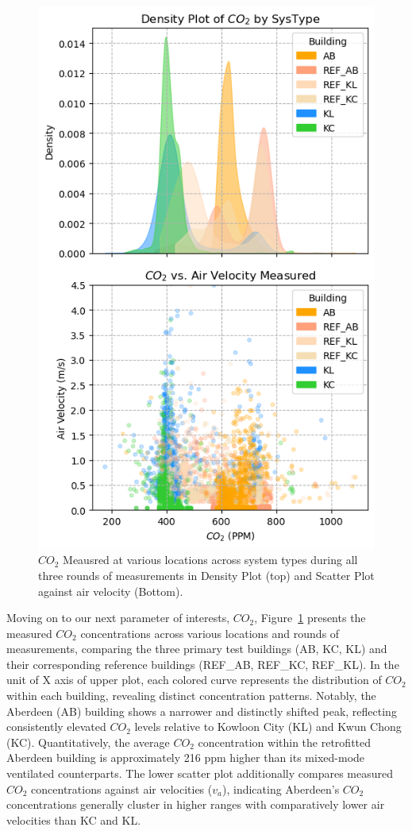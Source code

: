 \documentclass[preprint,12pt]{elsarticle}
\begin{document}
\begin{figure}[h!]
    \centering
    \includegraphics[width=0.5\linewidth]{COST_CO2.png}
    \caption{$CO_2$ Meausred at various locations across system types during all three rounds of measurements in Density Plot (top) and Scatter Plot  against air velocity (Bottom).}
    \label{fig:$CO_2$-types-meas}
\end{figure}


Moving on to our next parameter of interests, $CO_2$, Figure~\ref{fig:$CO_2$-types-meas} presents the measured $CO_2$ concentrations across various locations and rounds of measurements, comparing the three primary test buildings (AB, KC, KL) and their corresponding reference buildings (REF\_AB, REF\_KC, REF\_KL). In the unit of X axis of upper plot, each colored curve represents the distribution of $CO_2$ within each building, revealing distinct concentration patterns. Notably, the Aberdeen (AB) building shows a narrower and distinctly shifted peak, reflecting consistently elevated $CO_2$ levels relative to Kowloon City (KL) and Kwun Chong (KC). Quantitatively, the average $CO_2$ concentration within the retrofitted Aberdeen building is approximately 216 ppm higher than its mixed-mode ventilated counterparts. The lower scatter plot additionally compares measured $CO_2$ concentrations against air velocities ($v_a$), indicating Aberdeen’s $CO_2$ concentrations generally cluster in higher ranges with comparatively lower air velocities than KC and KL.

\end{document}
